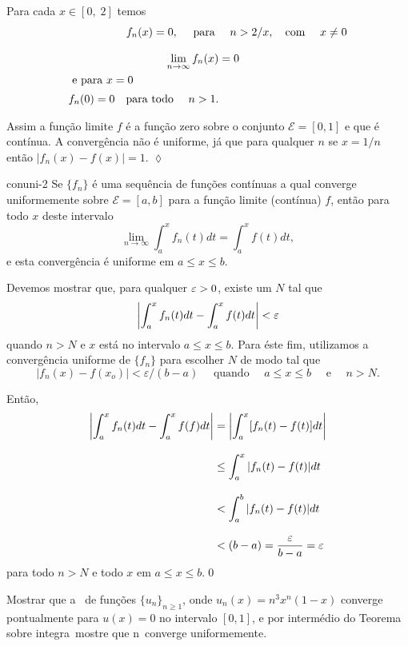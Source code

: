 \solo Para cada $x\in [0,\; 2]$ temos
\begin{align*}
  f_n(x)=0,\quad \text{ para } &\quad n>2/x,\quad\text{com }\quad x\neq 0\\[2ex]
\lim_{n\to\infty}f_n(x)&=0\\
\intertext{ e para $x=0$ } f_n(0)=0\quad \text{para todo }\quad
n>1.
\end{align*}

Assim a função limite $f$ é a função zero sobre o conjunto
$\mathcal{E}=[0,1]$ e que é contínua. A convergência não é
uniforme, já que para qualquer $n$ se $x=1/n$ então
$|f_n(x)-f(x)|=1$. \hfill \(\lozenge\)

\begin{theoc}{}{conuni-2}
Se $\{f_n\}$ é uma sequência de funções contínuas a qual converge
uniformemente sobre $\mathcal{E}=[a, b]$ para a função limite
(contínua) $f$, então para todo $x$ deste intervalo
\[
\lim_{n\to\infty}\int_a^xf_n(t)dt=\int_a^xf(t) dt,
\]
e esta convergência é uniforme em $a \leq x \leq b$.
\end{theoc}

\prova Devemos mostrar que, para qualquer $\varepsilon > 0$, existe um
$N$ tal que
\begin{equation*}
  \left|\int_a^xf_n(t)dt - \int_a^xf(t) dt\right|<\varepsilon
\end{equation*}
quando $n > N$ e $x$ está no intervalo $a \leq x \leq b$. Para
éste fim, utilizamos a convergência uniforme de $\{f_n\}$ para
escolher $N$ de modo tal que
\begin{equation*}
  |f_n(x)-f(x_o)| < \varepsilon/(b-a)\quad \text{ quando }\quad  a \leq
x\leq b \quad \text{ e }\quad  n>N.
\end{equation*}

Então,
\begin{align*}
\left|\int_a^xf_n(t)dt - \int_a^xf(f) dt\right|
&=\left|\int_a^x[f_n(t)- f(t)]dt\right|\\[2ex]
 & \leq \int_a^x|f_n(t)- f(t)| dt\\[2ex]
 &< \int_a^b|f_n(t)- f(t)| dt\\[2ex]
 &< (b-a)= \frac{\varepsilon}{ b -a}=\varepsilon
\end{align*}
para todo $n>N$ e todo $x$ em $ a \leq x \leq b$.\qed

\begin{exer}
Mostrar que a \seq\  de funções $\{u_n\}_{n\geq 1}$, onde
$u_n(x)=n^3x^n(1-x)$ converge pontualmente para $u(x)=0$ no
intervalo $[0,1]$, e por intermédio do Teorema sobre integra\cao\
mostre que n\ao\ converge uniformemente.
\end{exer}


